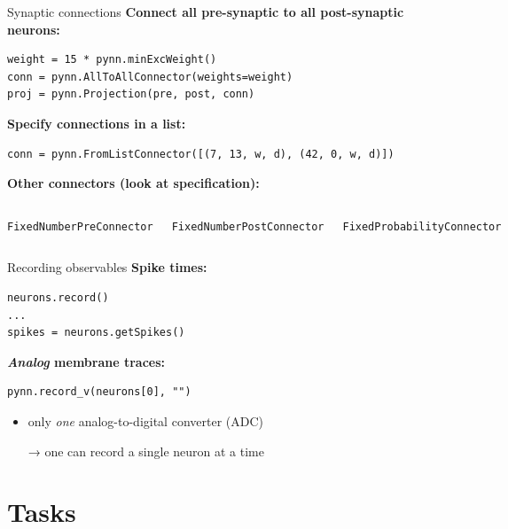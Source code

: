 \documentclass[aspectratio=169]{beamer}
\begin{document}
\begin{frame}[fragile]{Synaptic connections}
	\textbf{Connect all pre-synaptic to all post-synaptic neurons:}
	\begin{verbatim}
weight = 15 * pynn.minExcWeight()
conn = pynn.AllToAllConnector(weights=weight)
proj = pynn.Projection(pre, post, conn)
	\end{verbatim}

	\vspace{3ex}

	\textbf{Specify connections in a list:}
	\begin{verbatim}
conn = pynn.FromListConnector([(7, 13, w, d), (42, 0, w, d)])
	\end{verbatim}

	\vspace{3ex}

	\textbf{Other connectors (look at specification):}
	\begin{columns}[onlytextwidth]
		\texttt{FixedNumberPreConnector}

		\texttt{FixedNumberPostConnector}

		\texttt{FixedProbabilityConnector}
	\end{columns}
\end{frame}

\begin{frame}[fragile]{Recording observables}
	\textbf{Spike times:}
	\begin{verbatim}
neurons.record()
...
spikes = neurons.getSpikes()
	\end{verbatim}

	\vspace{3ex}

	\textbf{\emph{Analog} membrane traces:}
	\begin{verbatim}
pynn.record_v(neurons[0], "")
	\end{verbatim}
	\begin{itemize}
		\item only \emph{one} analog-to-digital converter (ADC)
		\item[→] one can record a single neuron at a time
	\end{itemize}
\end{frame}

\section{Tasks}
\end{document}
